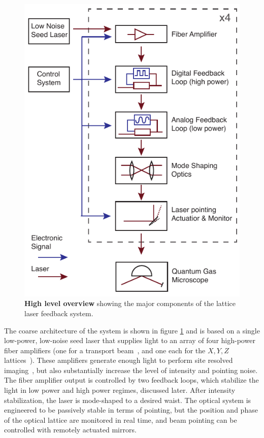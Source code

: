 \documentclass[twocolumn,aps,pra,showpacs,preprintnumbers,bibnotes]{revtex4-1}
\begin{document}
\begin{figure}[t]
  \begin{center}
    \includegraphics[width=0.85\columnwidth]{fig/figure1/figure1.pdf}
    \caption{\textbf{High level overview} showing the major components of the lattice laser feedback system.}\label{fig:high_level}
  \end{center}
\end{figure}

The coarse architecture of the system is shown in figure \ref{fig:high_level} and is based on a single low-power, low-noise seed laser that supplies light to an array of four high-power fiber amplifiers (one for a transport beam~\cite{Huber2014}, and one each for the $X,Y,Z$ lattices~\cite{Parsons2016}).
These amplifiers generate enough light to perform site resolved imaging~\cite{Parsons2015}, but also substantially increase the level of intensity and pointing noise. 
The fiber amplifier output is controlled by two feedback loops, which stabilize the light in low power and high power regimes, discussed later.
After intensity stabilization, the laser is mode-shaped to a desired waist.
The optical system is engineered to be passively stable in terms of pointing, but the position and phase of the optical lattice are monitored in real time, and beam pointing can be controlled with remotely actuated mirrors.
\end{document}
